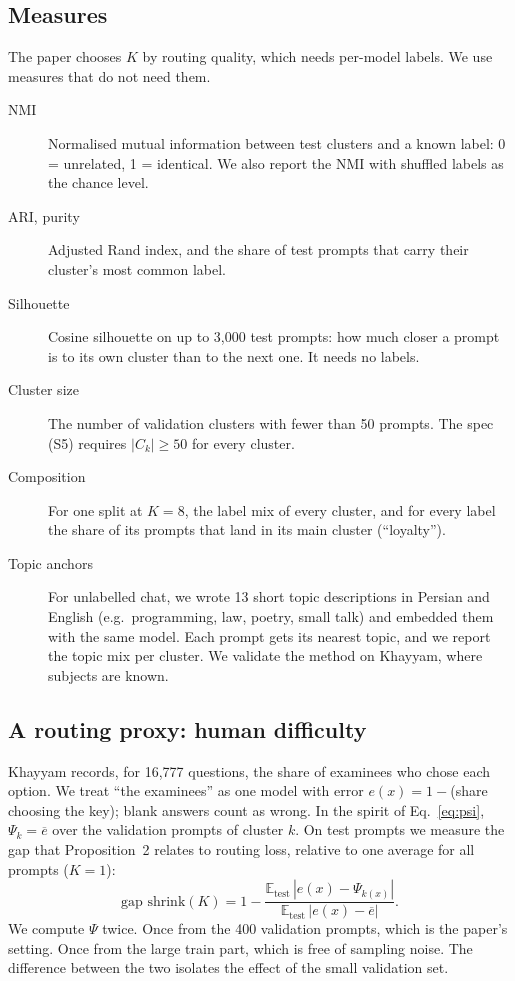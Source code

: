 \documentclass[11pt,a4paper]{article}
\begin{document}
\subsection{Measures}

The paper chooses $K$ by routing quality, which needs per-model labels. We use measures that do not need them.

\begin{description}
\item[NMI] Normalised mutual information between test clusters and a known label: 0 = unrelated, 1 = identical.
We also report the NMI with shuffled labels as the chance level.
\item[ARI, purity] Adjusted Rand index, and the share of test prompts that carry their cluster's most common label.
\item[Silhouette] Cosine silhouette on up to 3{,}000 test prompts: how much closer a prompt is to its own cluster
than to the next one. It needs no labels.
\item[Cluster size] The number of validation clusters with fewer than 50 prompts. The spec (S5) requires
$|C_k|\ge50$ for every cluster.
\item[Composition] For one split at $K=8$, the label mix of every cluster, and for every label the share of its
prompts that land in its main cluster (``loyalty'').
\item[Topic anchors] For unlabelled chat, we wrote 13 short topic descriptions in Persian and English (e.g.\ programming,
law, poetry, small talk) and embedded them with the same model. Each prompt gets its nearest topic, and we report
the topic mix per cluster. We validate the method on Khayyam, where subjects are known.
\end{description}

\subsection{A routing proxy: human difficulty}\label{sec:proxy}

Khayyam records, for 16{,}777 questions, the share of examinees who chose each option. We treat ``the examinees''
as one model with error $e(x)=1-$(share choosing the key); blank answers count as wrong. In the spirit of
Eq.~\eqref{eq:psi}, $\Psi_k=\overline{e}$ over the validation prompts of cluster $k$. On test prompts we measure the
gap that Proposition~2 relates to routing loss, relative to one average for all prompts ($K=1$):
\begin{equation}
\text{gap shrink}(K)=1-\frac{\mathbb E_{\text{test}}\,|e(x)-\Psi_{k(x)}|}{\mathbb E_{\text{test}}\,|e(x)-\overline e|}.
\end{equation}
We compute $\Psi$ twice. Once from the 400 validation prompts, which is the paper's setting. Once from the large
train part, which is free of sampling noise. The difference between the two isolates the effect of the small
validation set.
\end{document}
